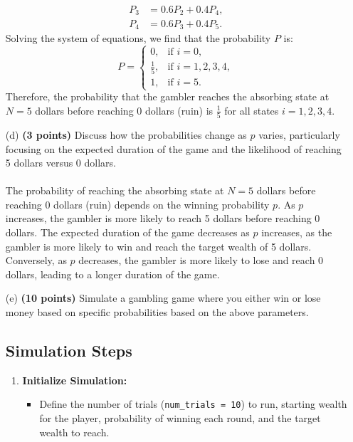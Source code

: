 \documentclass{article}
\begin{document}
\begin{itemize}
\[\begin{aligned}
    P_3 & = 0.6P_2 + 0.4P_4, \\
    P_4 & = 0.6P_3 + 0.4P_5.
    \end{aligned}
    \]
    Solving the system of equations, we find that the probability \( P \) is:
    \[
    P = \begin{cases}
    0, & \text{if } i = 0, \\
    \frac{1}{5}, & \text{if } i = 1, 2, 3, 4, \\
    1, & \text{if } i = 5.
    \end{cases}
    \]
    Therefore, the probability that the gambler reaches the absorbing state at \( N = 5 \) dollars before reaching 0 dollars (ruin) is \( \frac{1}{5} \) for all states \( i = 1, 2, 3, 4 \).

    \item[(d)] \textbf{(3 points)} Discuss how the probabilities change as \( p \) varies, particularly focusing on the expected duration of the game and the likelihood of reaching 5 dollars versus 0 dollars.
    \\\\ The probability of reaching the absorbing state at \( N = 5 \) dollars before reaching 0 dollars (ruin) depends on the winning probability \( p \). As \( p \) increases, the gambler is more likely to reach 5 dollars before reaching 0 dollars. The expected duration of the game decreases as \( p \) increases, as the gambler is more likely to win and reach the target wealth of 5 dollars. Conversely, as \( p \) decreases, the gambler is more likely to lose and reach 0 dollars, leading to a longer duration of the game.
    \item[(e)] \textbf{(10 points)} Simulate a gambling game where you either win or lose money based on specific probabilities based on the above parameters. 




\subsection*{Simulation Steps}

\begin{enumerate}
    
    \item \textbf{Initialize Simulation:}
    \begin{itemize}
        \item Define the number of trials (\texttt{num\_trials = 10}) to run, starting wealth for the player, probability of winning each round, and the target wealth to reach.
    \end{itemize}
    

\end{enumerate}
\end{itemize}
\end{document}
